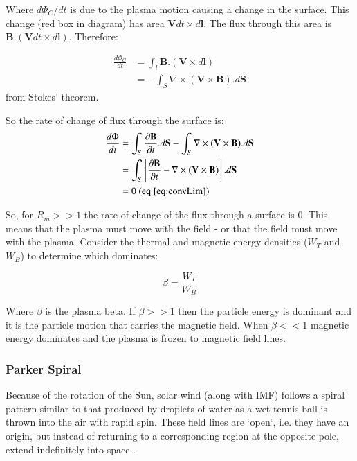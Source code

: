 \documentclass[12pt]{article}
\begin{document}
\noindent Where $d\Phi_C/dt$ is due to the plasma motion causing a change in the surface.
This change (red box in diagram) has area $\textbf{V}dt\times d\textbf{l}$. The flux through this area is $\textbf{B}.(\textbf{V}dt\times d\textbf{l})$. Therefore:

\begin{align}
    \frac{d\Phi_C}{dt}&=\int_l\textbf{B}.(\textbf{V}\times d\textbf{l}) \nonumber\\
    &=-\int_S\nabla\times(\textbf{V}\times\textbf{B}).d\textbf{S}
\end{align}
from Stokes' theorem.

\noindent So the rate of change of flux through the surface is:
\begin{align}
    \frac{d\Phi}{dt}&=\int_S\frac{\partial\textbf{B}}{\partial t}.d\textbf{S}-\int_S\nabla\times(\textbf{V}\times\textbf{B}).d\textbf{S} \nonumber\\
    &= \int_S\left[\frac{\partial\textbf{B}}{\partial t}-\nabla\times(\textbf{V}\times\textbf{B})\right].d\textbf{S} \nonumber\\
    &= 0\text{ (eq \ref{eq:convLim})}
\end{align}

\noindent So, for $R_m >> 1$ the rate of change of the flux through a surface is 0. This means that the plasma must move with the field - or that the field must move with the plasma. Consider the thermal and magnetic energy densities ($W_T$ and $W_B$) to determine which dominates:

\begin{equation}
    \beta=\frac{W_T}{W_B}
\end{equation}

\noindent Where $\beta$ is the plasma beta. If $\beta>>1$ then the particle energy is dominant and it is the particle motion that carries the magnetic field. When $\beta<<1$ magnetic energy dominates and the plasma is frozen to magnetic field lines.

\subsubsection{Parker Spiral}

Because of the rotation of the Sun, solar wind (along with IMF) follows a spiral pattern similar to that produced by droplets of water as a wet tennis ball is thrown into the air with rapid spin. These field lines are `open`, i.e. they have an origin, but instead of returning to a corresponding region at the opposite pole, extend indefinitely into space \cite{imfUptoLat16}. 
\end{document}

